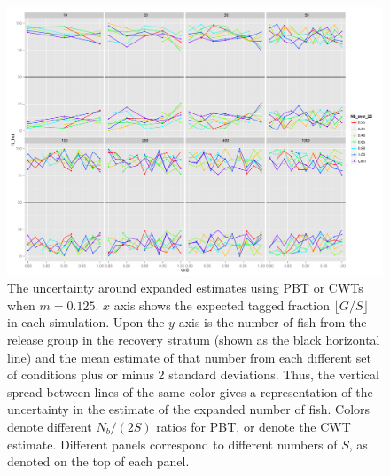 \documentclass[11pt]{article}
\begin{document}
\begin{figure}
\includegraphics[width = .93\textwidth]{./images/sd_line_horns_m_0_125.pdf}
\caption{The uncertainty around expanded estimates using PBT or CWTs when $m = 0.125$.  $x$ axis shows the
expected tagged fraction $\lfloor G/S \rfloor$ in each simulation. Upon the $y$-axis is the number of fish from the
release group in the recovery stratum (shown as the black horizontal line) and the mean estimate of that number from each different set of 
conditions plus or minus 2 standard deviations.  Thus, the vertical spread between lines of the same color gives a representation
of the uncertainty in the estimate of the expanded number of fish. Colors denote different $N_b/(2S)$ ratios for PBT, or denote
the CWT estimate.  Different
panels correspond to different numbers of $S$, as denoted on the top of each panel.
\label{fig:horn0.125}}
\end{figure}
\end{document}
